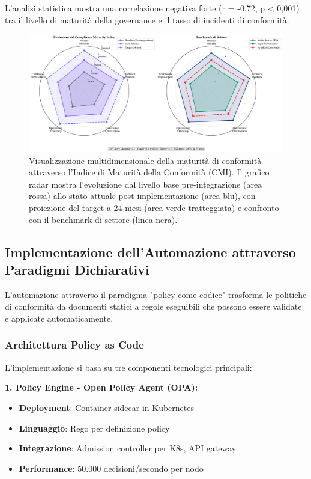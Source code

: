 L'analisi statistica mostra una correlazione negativa forte (r = -0,72, p < 0,001) tra il livello di maturità della governance e il tasso di incidenti di conformità.

\begin{figure}[htbp]
\centering
\includegraphics[width=\textwidth]{thesis_figures/cap4/figura_4_2_cmi_radar.pdf}
\caption{Visualizzazione multidimensionale della maturità di conformità attraverso l'Indice di Maturità della Conformità (CMI). Il grafico radar mostra l'evoluzione dal livello base pre-integrazione (area rossa) allo stato attuale post-implementazione (area blu), con proiezione del target a 24 mesi (area verde tratteggiata) e confronto con il benchmark di settore (linea nera).}
\label{fig:cmi_radar}
\end{figure}

\subsection{Implementazione dell'Automazione attraverso Paradigmi Dichiarativi}

L'automazione attraverso il paradigma "policy come codice" trasforma le politiche di conformità da documenti statici a regole eseguibili che possono essere validate e applicate automaticamente\autocite{Brynjolfsson2016}.

\subsubsection{Architettura Policy as Code}

L'implementazione si basa su tre componenti tecnologici principali:

\textbf{1. Policy Engine - Open Policy Agent (OPA):}
\begin{itemize}
    \item \textbf{Deployment}: Container sidecar in Kubernetes
    \item \textbf{Linguaggio}: Rego per definizione policy
    \item \textbf{Integrazione}: Admission controller per K8s, API gateway
    \item \textbf{Performance}: 50.000 decisioni/secondo per nodo
\end{itemize}

